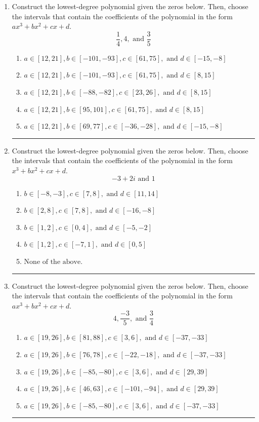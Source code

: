 \documentclass[14pt]{extbook}
\newcommand{\litem}[1]{\item#1\hspace*{-1cm}\rule{\textwidth}{0.4pt}}
\begin{document}
\begin{enumerate}
\litem{
Construct the lowest-degree polynomial given the zeros below. Then, choose the intervals that contain the coefficients of the polynomial in the form $ax^3+bx^2+cx+d$.\[ \frac{1}{4}, 4, \text{ and } \frac{3}{5} \]\begin{enumerate}[label=\Alph*.]
\item \( a \in [12, 21], b \in [-101, -93], c \in [61, 75], \text{ and } d \in [-15, -8] \)
\item \( a \in [12, 21], b \in [-101, -93], c \in [61, 75], \text{ and } d \in [8, 15] \)
\item \( a \in [12, 21], b \in [-88, -82], c \in [23, 26], \text{ and } d \in [8, 15] \)
\item \( a \in [12, 21], b \in [95, 101], c \in [61, 75], \text{ and } d \in [8, 15] \)
\item \( a \in [12, 21], b \in [69, 77], c \in [-36, -28], \text{ and } d \in [-15, -8] \)

\end{enumerate} }
\litem{
Construct the lowest-degree polynomial given the zeros below. Then, choose the intervals that contain the coefficients of the polynomial in the form $x^3+bx^2+cx+d$.\[ -3 + 2 i \text{ and } 1 \]\begin{enumerate}[label=\Alph*.]
\item \( b \in [-8, -3], c \in [7, 8], \text{ and } d \in [11, 14] \)
\item \( b \in [2, 8], c \in [7, 8], \text{ and } d \in [-16, -8] \)
\item \( b \in [1, 2], c \in [0, 4], \text{ and } d \in [-5, -2] \)
\item \( b \in [1, 2], c \in [-7, 1], \text{ and } d \in [0, 5] \)
\item \( \text{None of the above.} \)

\end{enumerate} }
\litem{
Construct the lowest-degree polynomial given the zeros below. Then, choose the intervals that contain the coefficients of the polynomial in the form $ax^3+bx^2+cx+d$.\[ 4, \frac{-3}{5}, \text{ and } \frac{3}{4} \]\begin{enumerate}[label=\Alph*.]
\item \( a \in [19, 26], b \in [81, 88], c \in [3, 6], \text{ and } d \in [-37, -33] \)
\item \( a \in [19, 26], b \in [76, 78], c \in [-22, -18], \text{ and } d \in [-37, -33] \)
\item \( a \in [19, 26], b \in [-85, -80], c \in [3, 6], \text{ and } d \in [29, 39] \)
\item \( a \in [19, 26], b \in [46, 63], c \in [-101, -94], \text{ and } d \in [29, 39] \)
\item \( a \in [19, 26], b \in [-85, -80], c \in [3, 6], \text{ and } d \in [-37, -33] \)

\end{enumerate} }
\end{enumerate}
\end{document}
